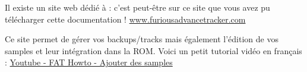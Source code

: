 Il existe un site web dédié à \FAT : c'est peut-être sur ce site que vous avez pu télécharger cette documentation !
\href{http://www.furiousadvancetracker.com}{www.furiousadvancetracker.com}
\medskip

Ce site permet de gérer vos backups/tracks mais également l'édition de vos samples et leur intégration dans la ROM.
Voici un petit tutorial vidéo en français : \href{https://www.youtube.com/watch?v=a9rPzz-6Mgg}{Youtube - FAT Howto - Ajouter des samples}
\medskip

